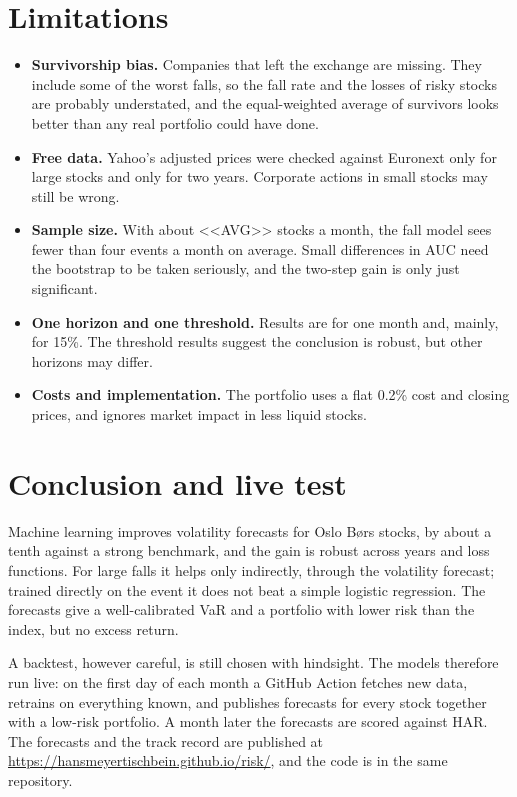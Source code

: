\documentclass[11pt,a4paper]{article}
\begin{document}
\section{Limitations}
\label{sec:limits}
\begin{itemize}
\item \textbf{Survivorship bias.} Companies that left the exchange are missing. They include some of the worst falls, so the fall rate and the losses of risky stocks are probably understated, and the equal-weighted average of survivors looks better than any real portfolio could have done.
\item \textbf{Free data.} Yahoo's adjusted prices were checked against Euronext only for large stocks and only for two years. Corporate actions in small stocks may still be wrong.
\item \textbf{Sample size.} With about <<AVG>> stocks a month, the fall model sees fewer than four events a month on average. Small differences in AUC need the bootstrap to be taken seriously, and the two-step gain is only just significant.
\item \textbf{One horizon and one threshold.} Results are for one month and, mainly, for 15\%. The threshold results suggest the conclusion is robust, but other horizons may differ.
\item \textbf{Costs and implementation.} The portfolio uses a flat 0.2\% cost and closing prices, and ignores market impact in less liquid stocks.
\end{itemize}

\section{Conclusion and live test}
Machine learning improves volatility forecasts for Oslo Børs stocks, by about a tenth against a strong benchmark, and the gain is robust across years and loss functions. For large falls it helps only indirectly, through the volatility forecast; trained directly on the event it does not beat a simple logistic regression. The forecasts give a well-calibrated VaR and a portfolio with lower risk than the index, but no excess return.

A backtest, however careful, is still chosen with hindsight. The models therefore run live: on the first day of each month a GitHub Action fetches new data, retrains on everything known, and publishes forecasts for every stock together with a low-risk portfolio. A month later the forecasts are scored against HAR. The forecasts and the track record are published at \url{https://hansmeyertischbein.github.io/risk/}, and the code is in the same repository.
\end{document}
